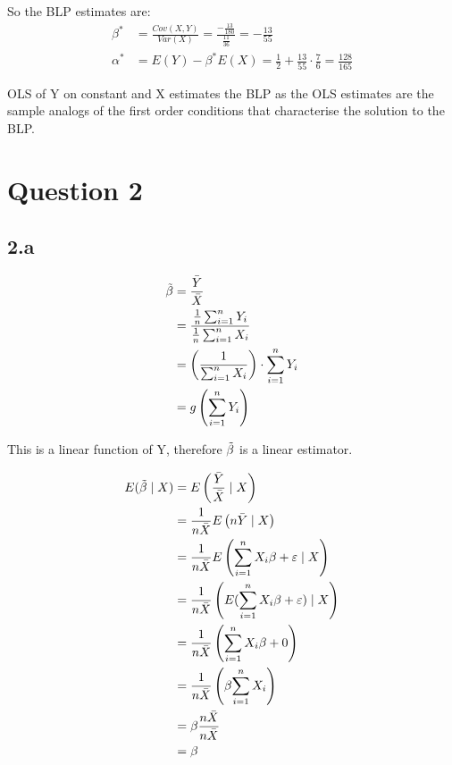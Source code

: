 \documentclass{article}
\begin{document}
So the BLP estimates are:
\begin{align*}
    \beta^{*} &= \frac{Cov(X, Y)}{Var(X)} 
    = \frac{-\frac{13}{180}}{\frac{11}{36}}
    = -\frac{13}{55} \\
    \alpha^{*} &= E(Y) - \beta^{*} E(X) 
    = \frac{1}{2} + \frac{13}{55} \cdot \frac{7}{6}
    = \frac{128}{165}
\end{align*}

OLS of Y on constant and X estimates the BLP as the OLS estimates are the sample analogs of the first order conditions that characterise the solution to the BLP.

\clearpage
\section*{Question 2}

\subsection*{2.a}
\begin{align*}
    \Tilde{\beta}
    &= \frac{\bar{Y}}{\bar{X}}\\
    &= \frac{\frac{1}{n}\sum_{i=1}^{n} Y_{i}}{\frac{1}{n}\sum_{i=1}^{n} X_{i}}\\
    &= \left(\frac{1}{\sum_{i=1}^{n} X_{i}}\right) \cdot \sum_{i=1}^{n} Y_{i}\\
    &= g\left(\sum_{i=1}^{n} Y_{i}\right)
\end{align*}

This is a linear function of Y, therefore $\Tilde{\beta}$ is a linear estimator.

\begin{align*}
    E(\Tilde{\beta} \mid X)
    &= E\left(\frac{\bar{Y}}{\bar{X}} \mid X\right)\\
    &= \frac{1}{n\bar{X}} E \left(n\bar{Y} \mid X \right)\\
    &= \frac{1}{n\bar{X}} E \left({\sum_{i=1}^{n} X_{i}\beta + \varepsilon} \mid X \right)\\
    &= \frac{1}{n\bar{X}} \left(E({\sum_{i=1}^{n} X_{i}\beta + \varepsilon}) \mid X \right)\\
    &= \frac{1}{n\bar{X}} \left({\sum_{i=1}^{n} X_{i}\beta + 0} \right)\\
    &= \frac{1}{n\bar{X}} \left(\beta{\sum_{i=1}^{n} X_{i}} \right)\\
    &= \beta\frac{n\bar{X}}{n\bar{X}} \\
    &= \beta
\end{align*}
\end{document}
